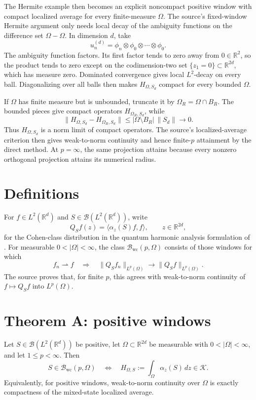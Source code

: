 \documentclass[11pt]{amsart}
\newcommand{\R}{\mathbb R}
\newcommand{\cB}{\mathcal B}
\newcommand{\cK}{\mathcal K}
\newcommand{\wc}{\mathrm{wc}}
\newcommand{\dd}{\,d}
\begin{document}
The Hermite example then becomes an explicit noncompact positive window with compact localized average for every finite-measure \(\Omega\).  The source's fixed-window Hermite argument only needs local decay of the ambiguity functions on the difference set \(\Omega-\Omega\).  In dimension \(d\), take
\[
u_n^{(d)}=\phi_n\otimes\phi_0\otimes\cdots\otimes\phi_0 .
\]
The ambiguity function factors.  Its first factor tends to zero away from \(0\in\R^2\), so the product tends to zero except on the codimension-two set \(\{z_1=0\}\subset\R^{2d}\), which has measure zero.  Dominated convergence gives local \(L^2\)-decay on every ball.  Diagonalizing over all balls then makes \(H_{\Omega,S_d}\) compact for every bounded \(\Omega\).

If \(\Omega\) has finite measure but is unbounded, truncate it by \(\Omega_R=\Omega\cap B_R\).  The bounded pieces give compact operators \(H_{\Omega_R,S_d}\), while
\[
\|H_{\Omega,S_d}-H_{\Omega_R,S_d}\|
\le |\Omega\setminus B_R|\,\|S_d\|\to0 .
\]
Thus \(H_{\Omega,S_d}\) is a norm limit of compact operators.  The source's localized-average criterion then gives weak-to-norm continuity and hence finite-\(p\) attainment by the direct method.  At \(p=\infty\), the same projection attains because every nonzero orthogonal projection attains its numerical radius.

\section*{Definitions}

For \(f\in L^2(\R^d)\) and \(S\in\cB(L^2(\R^d))\), write
\[
Q_Sf(z)=\langle \alpha_z(S)f,f\rangle,\qquad z\in\R^{2d},
\]
for the Cohen-class distribution in the quantum harmonic analysis formulation of \cite{ST}.  For measurable \(0<|\Omega|<\infty\), the class \(\cB_{\wc}(p,\Omega)\) consists of those windows for which
\[
f_n\rightharpoonup f
\quad\Longrightarrow\quad
\|Q_Sf_n\|_{L^p(\Omega)}\to \|Q_Sf\|_{L^p(\Omega)}.
\]
The source proves that, for finite \(p\), this agrees with weak-to-norm continuity of \(f\mapsto Q_Sf\) into \(L^p(\Omega)\).

\section*{Theorem A: positive windows}

Let \(S\in\cB(L^2(\R^d))\) be positive, let \(\Omega\subset\R^{2d}\) be measurable with \(0<|\Omega|<\infty\), and let \(1\le p<\infty\).  Then
\[
S\in\cB_{\wc}(p,\Omega)
\quad\Longleftrightarrow\quad
H_{\Omega,S}:=\int_\Omega\alpha_z(S)\dd z\in\cK .
\]
Equivalently, for positive windows, weak-to-norm continuity over \(\Omega\) is exactly compactness of the mixed-state localized average.
\end{document}
